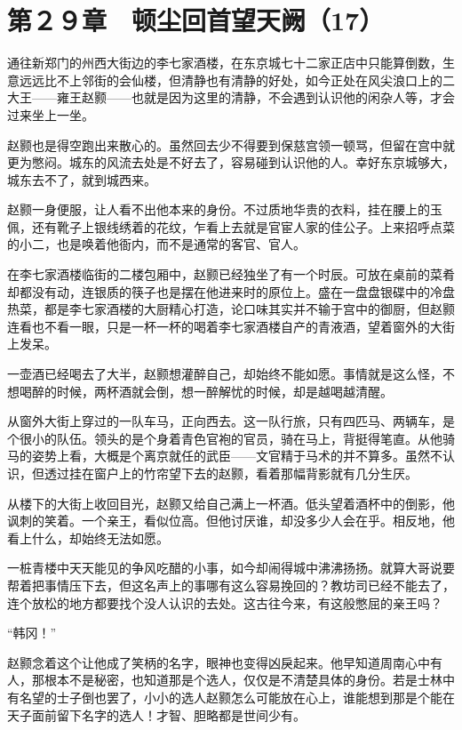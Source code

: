 \section{第２９章　顿尘回首望天阙（17）}

通往新郑门的州西大街边的李七家酒楼，在东京城七十二家正店中只能算倒数，生意远远比不上邻街的会仙楼，但清静也有清静的好处，如今正处在风尖浪口上的二大王——雍王赵颢——也就是因为这里的清静，不会遇到认识他的闲杂人等，才会过来坐上一坐。

赵颢也是得空跑出来散心的。虽然回去少不得要到保慈宫领一顿骂，但留在宫中就更为憋闷。城东的风流去处是不好去了，容易碰到认识他的人。幸好东京城够大，城东去不了，就到城西来。

赵颢一身便服，让人看不出他本来的身份。不过质地华贵的衣料，挂在腰上的玉佩，还有靴子上银线绣着的花纹，乍看上去就是官宦人家的佳公子。上来招呼点菜的小二，也是唤着他衙内，而不是通常的客官、官人。

在李七家酒楼临街的二楼包厢中，赵颢已经独坐了有一个时辰。可放在桌前的菜肴却都没有动，连银质的筷子也是摆在他进来时的原位上。盛在一盘盘银碟中的冷盘热菜，都是李七家酒楼的大厨精心打造，论口味其实并不输于宫中的御厨，但赵颢连看也不看一眼，只是一杯一杯的喝着李七家酒楼自产的青液酒，望着窗外的大街上发呆。

一壶酒已经喝去了大半，赵颢想灌醉自己，却始终不能如愿。事情就是这么怪，不想喝醉的时候，两杯酒就会倒，想一醉解忧的时候，却是越喝越清醒。

从窗外大街上穿过的一队车马，正向西去。这一队行旅，只有四匹马、两辆车，是个很小的队伍。领头的是个身着青色官袍的官员，骑在马上，背挺得笔直。从他骑马的姿势上看，大概是个离京就任的武臣——文官精于马术的并不算多。虽然不认识，但透过挂在窗户上的竹帘望下去的赵颢，看着那幅背影就有几分生厌。

从楼下的大街上收回目光，赵颢又给自己满上一杯酒。低头望着酒杯中的倒影，他讽刺的笑着。一个亲王，看似位高。但他讨厌谁，却没多少人会在乎。相反地，他看上什么，却始终无法如愿。

一桩青楼中天天能见的争风吃醋的小事，如今却闹得城中沸沸扬扬。就算大哥说要帮着把事情压下去，但这名声上的事哪有这么容易挽回的？教坊司已经不能去了，连个放松的地方都要找个没人认识的去处。这古往今来，有这般憋屈的亲王吗？

“韩冈！”

赵颢念着这个让他成了笑柄的名字，眼神也变得凶戾起来。他早知道周南心中有人，那根本不是秘密，也知道那是个选人，仅仅是不清楚具体的身份。若是士林中有名望的士子倒也罢了，小小的选人赵颢怎么可能放在心上，谁能想到那是个能在天子面前留下名字的选人！才智、胆略都是世间少有。

